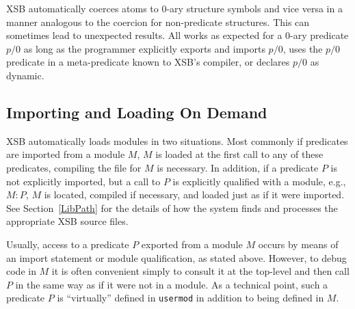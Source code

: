 XSB automatically coerces atoms to 0-ary structure symbols and vice
versa in a manner analogous to the coercion for non-predicate
structures.
This can sometimes lead to unexpected results.  All works as expected
for a 0-ary predicate $p/0$ as long as the programmer explicitly
exports and imports $p/0$, uses the $p/0$ predicate in a
meta-predicate known to XSB's compiler, or declares $p/0$ as dynamic.

\subsection{Importing and Loading On Demand} 

XSB automatically loads modules in two situations.  Most commonly if
predicates are imported from a module $M$, $M$ is loaded at the first
call to any of these predicates, compiling the file for $M$ is
necessary.  In addition, if a predicate $P$ is not explicitly
imported, but a call to $P$ is explicitly qualified with a module,
e.g., $M:P$, $M$ is located, compiled if necessary, and loaded just as
if it were imported.  See Section~\ref{LibPath} for the details of how
the system finds and processes the appropriate XSB source files.

Usually, access to a predicate $P$ exported from a module $M$ occurs
by means of an import statement or module qualification, as stated
above.  However, to debug code in $M$ it is often convenient simply to
consult it at the top-level and then call $P$ in the same way as if it
were not in a module.
As a technical point, such a predicate $P$ is ``virtually'' defined in
{\tt usermod} in addition to being defined in $M$.

